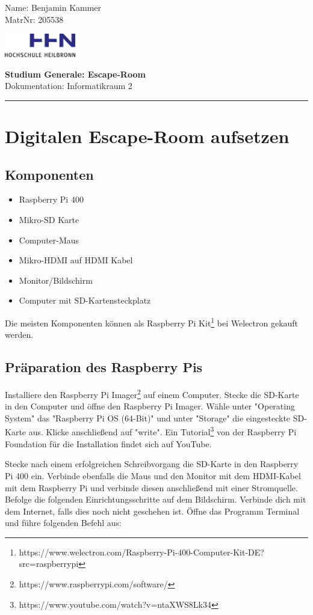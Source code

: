 \documentclass[12pt, letterpaper]{article}
\renewcommand\maketitle{
    \begin{flushleft}
        Name: Benjamin Kammer \\
        MatrNr: 205538
    \end{flushleft}

    \begin{flushright}\vspace{-15mm}
        \includegraphics[width=3.1cm]{logo.png}
    \end{flushright}

    \begin{center}
        \textbf{\large Studium Generale: Escape-Room}\\
        Dokumentation: Informatikraum 2
    \end{center}

    \rule{\linewidth}{0.1mm}

    \bigskip
}
\begin{document}
\maketitle

\section{Digitalen Escape-Room aufsetzen}
\subsection{Komponenten}

\begin{itemize}
	\item Raspberry Pi 400
    \item Mikro-SD Karte
	\item Computer-Maus
	\item Mikro-HDMI auf HDMI Kabel
	\item Monitor/Bildschirm
    \item Computer mit SD-Kartensteckplatz
\end{itemize}

Die meisten Komponenten können als Raspberry Pi Kit\footnote{https://www.welectron.com/Raspberry-Pi-400-Computer-Kit-DE?src=raspberrypi} bei Welectron gekauft werden.

\subsection{Präparation des Raspberry Pis}

Installiere den Raspberry Pi Imager\footnote{https://www.raspberrypi.com/software/} auf einem Computer.
Stecke die SD-Karte in den Computer und öffne den Raspberry Pi Imager.
Wähle unter "Operating System" das "Raspberry Pi OS (64-Bit)" und unter "Storage" die eingesteckte SD-Karte aus.
Klicke anschließend auf "write".
Ein Tutorial\footnote{https://www.youtube.com/watch?v=ntaXWS8Lk34} von der Raspberry Pi Foundation für die Installation findet sich auf YouTube.

Stecke nach einem erfolgreichen Schreibvorgang die SD-Karte in den Raspberry Pi 400 ein.
Verbinde ebenfalls die Maus und den Monitor mit dem HDMI-Kabel mit dem Raspberry Pi und verbinde diesen anschließend mit einer Stromquelle.
Befolge die folgenden Einrichtungsschritte auf dem Bildschirm.
Verbinde dich mit dem Internet, falls dies noch nicht geschehen ist.
Öffne das Programm Terminal und führe folgenden Befehl aus:
\end{document}
